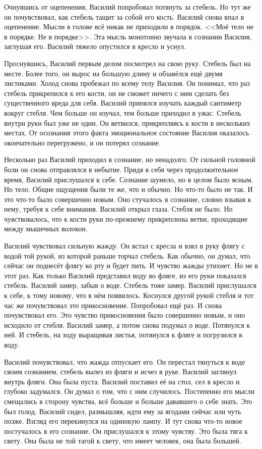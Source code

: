 \documentclass[12pt]{article}
\begin{document}
Очнувшись от оцепенения, Василий попробовал потянуть за стебель. Но тут же
он почувствовал, как стебель тащит за собой его кость. Василий снова впал
в оцепенение. Мысли в голове всё никак не приходили в порядок.
<<Моё тело не в порядке. Не в порядке>>. Эта мысль монотонно звучала
в сознании Василия, заглушая его. Василий тяжело опустился в кресло и
уснул.

Проснувшись, Василий первым делом посмотрел на свою руку. Стебель был на
месте. Более того, он вырос на большую длину и обзавёлся ещё двумя листиками.
Холод снова пробежал по всему телу Василия. Он понимал, что раз стебель
прикрепился к его кости, он не сможет ничего с ним сделать без существенного
вреда для себя. Василий принялся изучать каждый сантиметр вокруг стебля.
Чем больше он изучал, тем больше приходил в ужас. Стебель внутри руки был уже
не один. Он ветвился, прикрепляясь к кости в нескольких местах.
От осознания этого факта эмоциональное состояние Василия оказалось
окончательно перегружено, и он потерял сознание.


Несколько раз Василий приходил в сознание, но ненадолго. От сильной головной
боли он снова отправлялся в небытие. Придя в себя через продолжительное
время, Василий прислушался к себе. Сознание шумело, но в целом было ясным.
Но тело. Общие ощущения были те же, что и обычно. Но что-то было не так.
И это что-то было совершенно новым. Оно стучалось в сознание, словно взывая
к нему, требуя к себе внимания. Василий открыл глаза. Стебля не было.
Но чувствовалось, что к кости руки по-прежнему прикреплены ветви,
проходящие между мышечных волокон.

Василий чувствовал сильную жажду.
Он встал с кресла и взял в руку флягу с водой той рукой, из которой раньше
торчал стебель. Как обычно, он думал, что сейчас
он поднесёт флягу ко рту и будет пить. И чувство жажды утихнет.
Но не в этот раз. Как только Василий представил воду во фляге, из его руки
показался стебель. Василий замер, забыв о воде. Стебель тоже замер.
Василий прислушался к себе, к тому новому, что в нём появилось. Коснулся
другой рукой стебля и тот час же почувствовал это прикосновение.
Попробовал ещё раз. И снова почувствовал его. Это чувство прикосновения
было совершенно новым, и оно исходило от стебля. Василий замер, а потом
снова подумал о воде. Потянулся к ней. И стебель, на ходу выращивая листья,
потянулся к фляге и погрузился в воду.

Василий почувствовал, что жажда отпускает его. Он перестал тянуться к воде
своим сознанием, стебель вылез из фляги и исчез в руке.
Василий заглянул внутрь фляги. Она была пуста. Василий поставил её на стол,
сел в кресло и глубоко задумался. Он думал о том, что с ним случилось.
Постепенно его мысли смещались в сторону чувства, всё больше и больше
дававшего о себе знать. Это был голод. Василий сидел, размышляя, идти
ему за ягодами сейчас или чуть позже. Взгляд его перекинулся на одинокую
лампу. И тут снова что-то новое постучалось в его сознание. Он прислушался
к этому чувству. Это была тяга к свету. Она была не той тагой к свету,
что имеет человек, она была большей.
\end{document}
